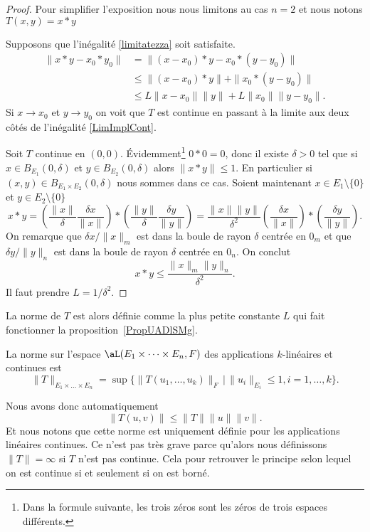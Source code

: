 \begin{proof}
    Pour simplifier l'exposition nous nous limitons au cas $n=2$ et nous notons $T(x,y)=x*y$

    Supposons que l'inégalité \eqref{limitatezza} soit satisfaite.
    \begin{equation}\label{LimImplCont}
      \begin{aligned}
        \|x*y-x_0*y_0\|&=\|(x-x_0)*y-x_0*(y-y_0)\|\\
    &\leq \|(x-x_0)*y\|+\|x_0*(y-y_0)\|\\
    &\leq L\|x-x_0\|\|y\| + L\|x_0\|\|y-y_0\|.
      \end{aligned}
    \end{equation}
    Si $x\to x_0$ et $y\to y_0$  on voit que $T$ est continue en passant à la limite aux deux côtés de l'inégalité \eqref{LimImplCont}.

    Soit $T$ continue en $(0,0)$. Évidemment\footnote{Dans la formule suivante, les trois zéros sont les zéros de trois espaces différents.} $0*0=0$, donc il existe $\delta>0$ tel que si $x\in B_{E_1}(0,\delta)$ et $y\in B_{E_2}(0,\delta)$ alors $\|x*y\|\leq 1$. En particulier si \( (x,y)\in B_{E_1\times E_2}(0,\delta)\) nous sommes dans ce cas. Soient maintenant  $x\in E_1\setminus\{ 0 \}$  et $y\in E_2\setminus\{ 0\}$
    \begin{equation}
        x*y=\left(\frac{\|x\|}{\delta}\frac{\delta x}{\|x\|}\right)*\left(\frac{\|y\|}{\delta}\frac{\delta y}{\|y\|}\right)
    =\frac{\|x\|\|y\|}{\delta^2} \left(\frac{\delta x}{\|x\|}\right)*\left(\frac{\delta y}{\|y\|}\right).
     \end{equation}
    On remarque que $\delta x/\|x\|_m$ est dans la boule de rayon $\delta$ centrée en $0_m$ et que $\delta y/\|y\|_n$ est dans la boule de rayon $\delta$ centrée en $0_n$. On conclut
    \[
     x*y\leq \frac{\|x\|_m\|y\|_n}{\delta^2}.
    \]
    Il faut prendre $L=1/\delta^2$.
\end{proof}

La norme de \( T\) est alors définie comme la plus petite constante \( L\) qui fait fonctionner la proposition~\ref{PropUADlSMg}.
\begin{definition}  \label{DefKPBYeyG}
	La norme sur l'espace $\aL(E_1\times \cdots\times E_n, F)$ des applications $k$-linéaires et continues est
	\begin{equation}
        \|T\|_{E_1\times \ldots\times E_n}=\sup\{ \|T(u_1, \ldots,u_k)\|_{F}\,\vert\,\|u_i\|_{E_i}\leq 1, i=1,\ldots, k \}.
	\end{equation}
\end{definition}
Nous avons donc automatiquement
\begin{equation}    \label{EqYLnbRbC}
    \| T(u,v) \|\leq \| T \|\| u \|\| v \|.
\end{equation}
Et nous notons que cette norme est uniquement définie pour les applications linéaires continues. Ce n'est pas très grave parce qu'alors nous définissons \( \| T \|=\infty\) si \( T\) n'est pas continue. Cela pour retrouver le principe selon lequel on est continue si et seulement si on est borné.

